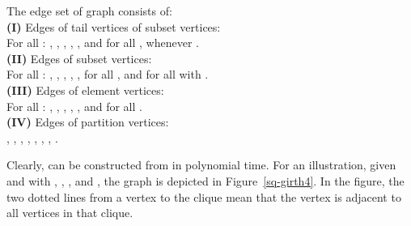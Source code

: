 \documentclass[proceedings]{stacs}
\newlength{\ai}
\begin{document}
\begin{center}
The edge set of graph  consists of:\\
\textbf{(I)} Edges of tail vertices of subset vertices:\\
       For all : , , , ,
       , and for all ,  whenever .\\
\textbf{(II)} Edges of subset vertices:\\
       For all : , , , ,
       ,  for all , and  for all  with .\\
\textbf{(III)} Edges of element vertices:\\
       For all : , , , , ,
       and  for all .\\
\textbf{(IV)} Edges of partition vertices:\\
       , , ,
       , , ,
       , .

Clearly,  can be constructed from  in polynomial time. For an illustration, given
 and  with ,
, , and , the graph  is depicted in
Figure~\ref{sq-girth4}. In the figure, the two dotted lines from a vertex to the clique
 mean that the vertex is adjacent to all vertices in that clique.


\end{center}
\end{document}
